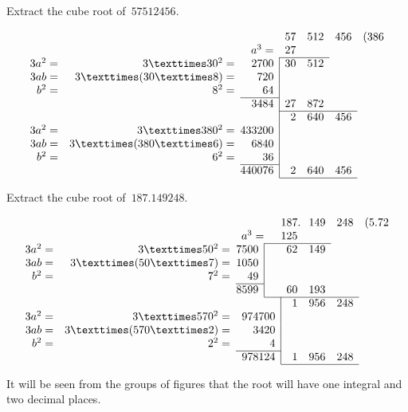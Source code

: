 \documentclass[12pt]{book}[2005/09/16]
\makeatletter
\newcommand{\PrintStretch}[1]{%
  \ifthenelse{\boolean{ForPrinting}}{\enlargethispage{#1}}{}%
}
\newenvironment{Soln}[1][]{\par\small\textsc{#1}}{\par}
\newcommand{\Z}{\phantom{0}}
\newcommand{\TbBar}[1]{\multicolumn{1}{@{}r|}{#1}}
\makeatother
\begin{document}
\PrintStretch{12pt}
Extract the cube root of~$57512456$.
\begin{Soln}
\[
\begin{array}{*{3}{r}*{4}{l}}
        &                &                &  57&512&456&(386 \\
        &                &         a^{3} =&  27 \\
\cline{4-5}
3a^{2} =&    3 × 30^{2} =&   \TbBar{2700} &  30&512 \\
   3ab =&  3 × (30 × 8) =&    \TbBar{720} \\
 b^{2} =&         8^{2} =&     \TbBar{64} \\
\cline{3-3}
        &                &   \TbBar{3484} &  27&872 \\
\cline{4-6}
        &               &        \TbBar{} & \Z2&640&456 \\
3a^{2} =&   3 × 380^{2} =& \TbBar{433200} \\
   3ab =& 3 × (380 × 6) =&   \TbBar{6840} \\
 b^{2} =&         6^{2} =&     \TbBar{36} \\
\cline{3-3}
        &               &  \TbBar{440076} & \Z2&640&456 \\
\cline{4-6}
\end{array}
\]
\end{Soln}

Extract the cube root of~$187.149248$.
\begin{Soln}
\[
\begin{array}{*{3}{r}@{}*{4}{r}l}
        &                &             & \multicolumn{2}{r}{187\rlap{.}}&149&248&(5.72 \\
        &                &      a^{3} =& \multicolumn{2}{r}{125} \\
\cline{4-6}
3a^{2} =&    3 × 50^{2} =& \TbBar{7500}&&        62&149 \\
   3ab =&  3 × (50 × 7) =& \TbBar{1050} \\
 b^{2} =&         7^{2} =&   \TbBar{49} \\
\cline{3-3}
        &                & \TbBar{8599}&&        60&193 \\
\cline{4-7}
        &                &             &  \TbBar{}&  1&956&248 \\
3a^{2} =&   3 × 570^{2} =&         9747&\TbBar{00} \\
   3ab =& 3 × (570 × 2) =&           34&\TbBar{20} \\
 b^{2} =&         2^{2} =&             & \TbBar{4} \\
\cline{3-4}
        &                &         9781&\TbBar{24}&  1&956&248 \\
\cline{5-7}
\end{array}
\]

It will be seen from the groups of figures that the root will have
one integral and two decimal places.
\end{Soln}
\end{document}
